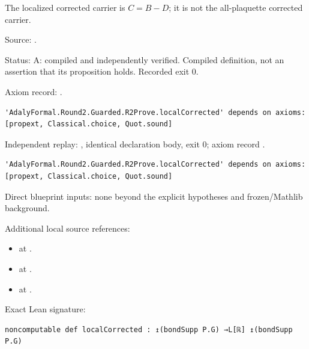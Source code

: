 \begin{definition}[bp-012]
\label{bp-012}
\uses{}
\leanok
The localized corrected carrier is \(C=B-D\); it is not the all-plaquette corrected carrier.

\par Source: \texttt{}.
\par Status: A: compiled and independently verified. Compiled definition, not an assertion that its proposition holds. Recorded exit 0.
\par Axiom record: \texttt{}.
\begin{verbatim}
'AdalyFormal.Round2.Guarded.R2Prove.localCorrected' depends on axioms: [propext, Classical.choice, Quot.sound]
\end{verbatim}
\par Independent replay: \texttt{}, identical declaration body, exit 0; axiom record \texttt{}.
\begin{verbatim}
'AdalyFormal.Round2.Guarded.R2Prove.localCorrected' depends on axioms: [propext, Classical.choice, Quot.sound]
\end{verbatim}
\par Direct blueprint inputs: none beyond the explicit hypotheses and frozen/Mathlib background.
\par Additional local source references:
\begin{itemize}
\item \texttt{} at \texttt{}.
\item \texttt{} at \texttt{}.
\item \texttt{} at \texttt{}.
\end{itemize}
\par Exact Lean signature:
\begin{verbatim}
noncomputable def localCorrected : ↥(bondSupp P.G) →L[ℝ] ↥(bondSupp P.G)
\end{verbatim}
\end{definition}

